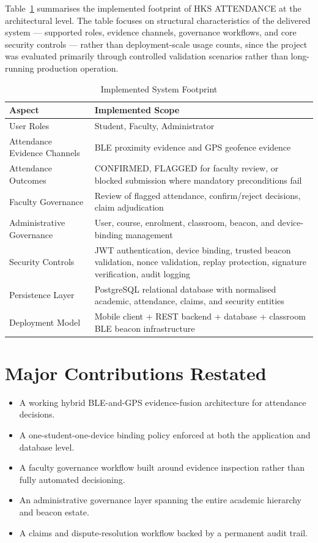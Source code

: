 \documentclass[12pt, a4paper, oneside]{report}
\begin{document}
Table~\ref{tab:system-footprint} summarises the implemented footprint of HKS ATTENDANCE at the architectural level. The table focuses on structural characteristics of the delivered system --- supported roles, evidence channels, governance workflows, and core security controls --- rather than deployment-scale usage counts, since the project was evaluated primarily through controlled validation scenarios rather than long-running production operation.

\begin{table}[htbp]
\centering
\caption{Implemented System Footprint}
\label{tab:system-footprint}
\begin{tabularx}{\textwidth}{|l|X|}
\hline
\textbf{Aspect} & \textbf{Implemented Scope} \\
\hline
User Roles & Student, Faculty, Administrator \\
\hline
Attendance Evidence Channels & BLE proximity evidence and GPS geofence evidence \\
\hline
Attendance Outcomes & CONFIRMED, FLAGGED for faculty review, or blocked submission where mandatory preconditions fail \\
\hline
Faculty Governance & Review of flagged attendance, confirm/reject decisions, claim adjudication \\
\hline
Administrative Governance & User, course, enrolment, classroom, beacon, and device-binding management \\
\hline
Security Controls & JWT authentication, device binding, trusted beacon validation, nonce validation, replay protection, signature verification, audit logging \\
\hline
Persistence Layer & PostgreSQL relational database with normalised academic, attendance, claims, and security entities \\
\hline
Deployment Model & Mobile client + REST backend + database + classroom BLE beacon infrastructure \\
\hline
\end{tabularx}
\end{table}

\section{Major Contributions Restated}
\begin{itemize}
    \item A working hybrid BLE-and-GPS evidence-fusion architecture for attendance decisions.
    \item A one-student-one-device binding policy enforced at both the application and database level.
    \item A faculty governance workflow built around evidence inspection rather than fully automated decisioning.
    \item An administrative governance layer spanning the entire academic hierarchy and beacon estate.
    \item A claims and dispute-resolution workflow backed by a permanent audit trail.
\end{itemize}
\end{document}

